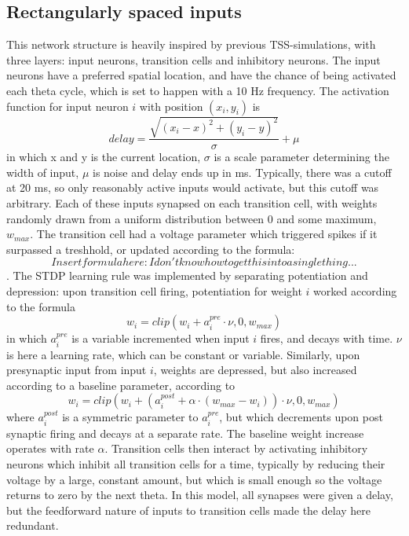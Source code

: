\documentclass{article}
\begin{document}
    \subsection{Rectangularly spaced inputs} This network structure is heavily inspired by previous TSS-simulations, with three layers: input neurons, transition cells and inhibitory neurons. The input neurons have a preferred spatial location, and have the chance of being activated each theta cycle, which is set to happen with a 10 Hz frequency. The activation function for input neuron \(i\) with position \((x_i, y_i)\) is \begin{equation} \label{key1} delay = \frac{\sqrt{(x_i - x)^2 + (y_i - y)^2}}{\sigma} + \mu\end{equation}
    in which x and y is the current location, \(\sigma\) is a scale parameter determining the width of input, \(\mu\) is noise and delay ends up in ms. Typically, there was a cutoff at 20 ms, so only reasonably active inputs would activate, but this cutoff was arbitrary. Each of these inputs synapsed on each transition cell, with weights randomly drawn from a uniform distribution between 0 and some maximum, \(w_{max}\). The transition cell had a voltage parameter which triggered spikes if it surpassed a treshhold, or updated according to the formula: \[ Insert formula here: I don't know how to get this into a single thing...\].
    The STDP learning rule was implemented by separating potentiation and depression: upon transition cell firing, potentiation for weight \(i\) worked according to the formula \begin{equation} \label{key3} w_i = clip(w_i + a^{pre}_i \cdot \nu, 0, w_{max})\end{equation} in which \(a^{pre}_i\) is a variable incremented when input \(i\) fires, and decays with time. \(\nu\) is here a learning rate, which can be constant or variable. 
    Similarly, upon presynaptic input from input \(i\), weights are depressed, but also increased according to a baseline parameter, according to \begin{equation} \label{key4} w_i = clip(w_i + (a^{post}_i + \alpha \cdot (w_{max}-w_i)) \cdot \nu, 0, w_{max})\end{equation} where \(a^{post}_i\) is a symmetric parameter to \(a^{pre}_i\), but which decrements upon post synaptic firing and decays at a separate rate. The baseline weight increase operates with rate \(\alpha\).
    Transition cells then interact by activating inhibitory neurons which inhibit all transition cells for a time, typically by reducing their voltage by a large, constant amount, but which is small enough so the voltage returns to zero by the next theta.
    In this model, all synapses were given a delay, but the feedforward nature of inputs to transition cells made the delay here redundant.
\end{document}
